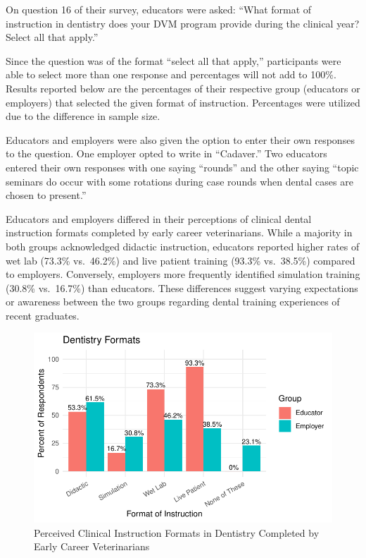 \documentclass[
  11pt,
  letterpaper,
  DIV=11,
  numbers=noendperiod]{scrartcl}
\numberwithin{figure}{section}
\begin{document}
On question 16 of their survey, educators were asked: ``What format of
instruction in dentistry does your DVM program provide during the
clinical year? Select all that apply.''

Since the question was of the format ``select all that apply,''
participants were able to select more than one response and percentages
will not add to 100\%. Results reported below are the percentages of
their respective group (educators or employers) that selected the given
format of instruction. Percentages were utilized due to the difference
in sample size.

Educators and employers were also given the option to enter their own
responses to the question. One employer opted to write in ``Cadaver.''
Two educators entered their own responses with one saying ``rounds'' and
the other saying ``topic seminars do occur with some rotations during
case rounds when dental cases are chosen to present.''

Educators and employers differed in their perceptions of clinical dental
instruction formats completed by early career veterinarians. While a
majority in both groups acknowledged didactic instruction, educators
reported higher rates of wet lab (73.3\% vs.~46.2\%) and live patient
training (93.3\% vs.~38.5\%) compared to employers. Conversely,
employers more frequently identified simulation training (30.8\%
vs.~16.7\%) than educators. These differences suggest varying
expectations or awareness between the two groups regarding dental
training experiences of recent graduates.

\begin{figure}[H]

{\centering \includegraphics{Final-Project_files/figure-pdf/formatgraph-1.pdf}

}

\caption{Perceived Clinical Instruction Formats in Dentistry Completed
by Early Career Veterinarians}

\end{figure}
\end{document}
